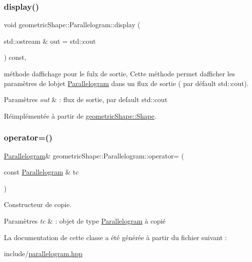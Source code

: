 \subsubsection{\texorpdfstring{display()}{display()}}
{\footnotesize\ttfamily void geometric\+Shape\+::\+Parallelogram\+::display (\begin{DoxyParamCaption}\item[{std\+::ostream \&}]{out = {\ttfamily std\+:\+:cout} }\end{DoxyParamCaption}) const\hspace{0.3cm}{\ttfamily [override]}, {\ttfamily [virtual]}}



méthode d\textquotesingle{}affichage pour le fulx de sortie, Cette méthode permet d\textquotesingle{}afficher les paramètres de l\textquotesingle{}objet \hyperlink{classgeometric_shape_1_1_parallelogram}{Parallelogram} dans un flux de sortie ( par défault std\+::cout). 


\begin{DoxyParams}{Paramètres}
{\em out} & \+: flux de sortie, par default std\+::cout \\
\hline
\end{DoxyParams}


Réimplémentée à partir de \hyperlink{classgeometric_shape_1_1_shape_af666bd629db0595afa79982548b6cf78}{geometric\+Shape\+::\+Shape}.

\mbox{\label{classgeometric_shape_1_1_parallelogram_a3c408a16bc3c0e40e0c26fde2279a9b9}} 
\subsubsection{\texorpdfstring{operator=()}{operator=()}}
{\footnotesize\ttfamily \hyperlink{classgeometric_shape_1_1_parallelogram}{Parallelogram}\& geometric\+Shape\+::\+Parallelogram\+::operator= (\begin{DoxyParamCaption}\item[{const \hyperlink{classgeometric_shape_1_1_parallelogram}{Parallelogram} \&}]{tc }\end{DoxyParamCaption})}



Constructeur de copie. 


\begin{DoxyParams}{Paramètres}
{\em tc} & \+: objet de type \hyperlink{classgeometric_shape_1_1_parallelogram}{Parallelogram} à copié \\
\hline
\end{DoxyParams}


La documentation de cette classe a été générée à partir du fichier suivant \+:\begin{DoxyCompactItemize}
\item 
include/\hyperlink{parallelogram_8hpp}{parallelogram.\+hpp}\end{DoxyCompactItemize}
